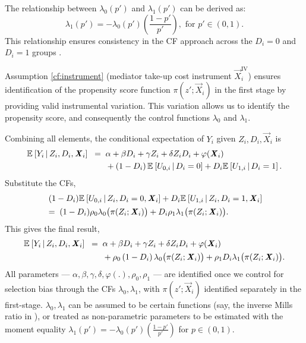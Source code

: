The relationship between $\lambda_0(p')$ and $\lambda_1(p')$ can be derived as:
\[ \lambda_1 \left(p'\right) = -\lambda_0 \left(p'\right) \left( \frac{1-p'}{p'} \right), \text{ for } p' \in (0,1). \]
This relationship ensures consistency in the CF approach across the $D_i=0$ and $D_i= 1$ groups \citep{kline2019heckits}.

Assumption \ref{cf:instrument} (mediator take-up cost instrument $\vec X_i^{\text{IV}}$) ensures identification of the propensity score function $\pi(z'; \vec X_i)$ in the first stage by providing valid instrumental variation.
This variation allows us to identify the propensity score, and consequently the control functions $\lambda_0$ and $\lambda_1$.

Combining all elements, the conditional expectation of $Y_i$ given $Z_i, D_i, \vec X_i$ is
\begin{align*}
    \mathbb{E}_{} \left[ Y_i \, \middle\vert \, Z_i, D_i, \boldsymbol{\mathit{X}}_i \right] \;\; =& \;\;
        \alpha
        + \beta D_i
        + \gamma Z_i
        + \delta Z_i D_i
        + \varphi(\boldsymbol{\mathit{X}}_i) \\
        & \;\; + \left( 1 - D_i \right) \mathbb{E}_{} \left[ U_{0,i} \, \middle\vert \, D_i = 0 \right]
            + D_i \mathbb{E}_{} \left[ U_{1,i} \, \middle\vert \, D_i = 1 \right].
\end{align*}
Substitute the CFs,
\begin{align*}
    &\;(1-D_i) \mathbb{E}_{} \left[  U_{0,i}  \, \middle\vert \, Z_i, D_i=0, \boldsymbol{\mathit{X}}_i \right]
        + D_i \mathbb{E}_{} \left[  U_{1,i} \, \middle\vert \, Z_i, D_i=1, \boldsymbol{\mathit{X}}_i \right] \\
    &=\; (1-D_i)\rho_0 \lambda_0 \big(\pi(Z_i; \boldsymbol{\mathit{X}}_i) \big)
    + D_i \rho_1 \lambda_1 \big(\pi(Z_i; \boldsymbol{\mathit{X}}_i) \big).
\end{align*}
This gives the final result,
\begin{align*}
    \mathbb{E}_{} \left[ Y_i \, \middle\vert \, Z_i, D_i, \boldsymbol{\mathit{X}}_i \right] \;\; =& \;\;
        \alpha
        + \beta D_i
        + \gamma Z_i
        + \delta Z_i D_i
        + \varphi(\boldsymbol{\mathit{X}}_i) \\
        & \;\; +  \rho_0 \left( 1 - D_i \right) \lambda_0 \big( \pi(Z_i ; \boldsymbol{\mathit{X}}_i) \big)
            + \rho_1 D_i \lambda_1 \big( \pi(Z_i ; \boldsymbol{\mathit{X}}_i) \big).
\end{align*}
All parameters --- $\alpha, \beta, \gamma, \delta, \varphi(.), \rho_0, \rho_1$ --- are identified once we control for selection bias through the CFs $\lambda_0, \lambda_1$, with $\pi(z';\vec X_i)$ identified separately in the first-stage.
$\lambda_0, \lambda_1$ can be assumed to be certain functions (say, the inverse Mills ratio in \citealt{heckman1979sample}), or treated as non-parametric parameters to be estimated with the moment equality $\lambda_1 \left(p'\right) = -\lambda_0 \left(p'\right) \left( \frac{1-p'}{p'} \right)$ for $p \in (0,1)$.

